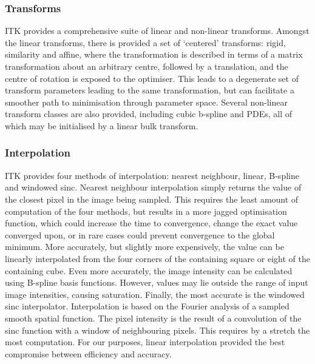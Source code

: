     \subsubsection{Transforms} %
    \label{ssub:transforms}
      ITK provides a comprehensive suite of linear and non-linear transforms. Amongst the linear transforms, there is provided a set of `centered' transforms: rigid, similarity and affine, where the transformation is described in terms of a matrix transformation about an arbitrary centre, followed by a translation, and the centre of rotation is exposed to the optimiser. This leads to a degenerate set of transform parameters leading to the same transformation, but can facilitate a smoother path to minimisation through parameter space. Several non-linear transform classes are also provided, including cubic b-spline and PDEs, all of which may be initialised by a linear bulk transform.
    
    \subsubsection{Interpolation} %
    \label{ssub:interpolation}
      ITK provides four methods of interpolation: nearest neighbour, linear, B-spline and windowed sinc. Nearest neighbour interpolation simply returns the value of the closest pixel in the image being sampled. This requires the least amount of computation of the four methods, but results in a more jagged optimisation function, which could increase the time to convergence, change the exact value converged upon, or in rare cases could prevent convergence to the global minimum. More accurately, but slightly more expensively, the value can be linearly interpolated from the four corners of the containing square or eight of the containing cube. Even more accurately, the image intensity can be calculated using B-spline basis functions. However, values may lie outside the range of input image intensities, causing saturation. Finally, the most accurate is the windowed sinc interpolator. Interpolation is based on the Fourier analysis of a sampled smooth spatial function. The pixel intensity is the result of a convolution of the sinc function with a window of neighbouring pixels. This requires by a stretch the most computation. For our purposes, linear interpolation provided the best compromise between efficiency and accuracy.
  
